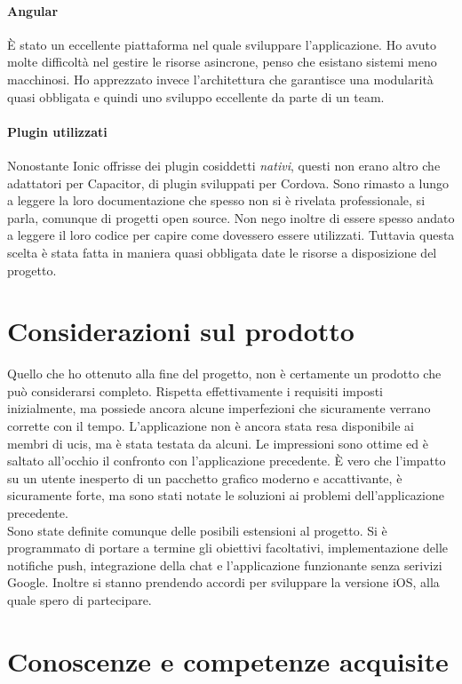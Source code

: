 \paragraph{Angular} È stato un eccellente piattaforma nel quale sviluppare l'applicazione. Ho avuto molte difficoltà nel
gestire le risorse asincrone, penso che esistano sistemi meno macchinosi. Ho apprezzato invece l'architettura che
garantisce una modularità quasi obbligata e quindi uno sviluppo eccellente da parte di un team.

\paragraph{Plugin utilizzati}
Nonostante Ionic offrisse dei plugin cosiddetti \textit{nativi}, questi non erano altro che adattatori per Capacitor, di plugin
sviluppati per Cordova. Sono rimasto a lungo a leggere la loro documentazione che spesso non si è rivelata
professionale, si parla, comunque di progetti open source. Non nego inoltre di essere spesso andato a leggere il loro
codice per capire come dovessero essere utilizzati. Tuttavia questa scelta è stata fatta in maniera quasi obbligata date
le risorse a disposizione del progetto. 

\section{Considerazioni sul prodotto}
Quello che ho ottenuto alla fine del progetto, non è certamente un prodotto che può considerarsi completo. Rispetta
effettivamente i requisiti imposti inizialmente, ma possiede ancora alcune imperfezioni che sicuramente verrano corrette
con il tempo. L'applicazione non è ancora stata resa disponibile ai membri di \gls{ucis}, ma è stata testata da alcuni.
Le impressioni sono ottime ed è saltato all'occhio il confronto con l'applicazione precedente. È vero che l'impatto su
un utente inesperto di un pacchetto grafico moderno e accattivante, è sicuramente forte, ma sono stati notate le
soluzioni ai problemi dell'applicazione precedente. \\
\noindent Sono state definite comunque delle posibili estensioni al progetto. Si è programmato di portare a termine gli
obiettivi facoltativi, implementazione delle notifiche push, integrazione della chat e l'applicazione funzionante senza
serivizi Google. Inoltre si stanno prendendo accordi per sviluppare la versione iOS, alla quale spero di partecipare.


\section{Conoscenze e competenze acquisite}

